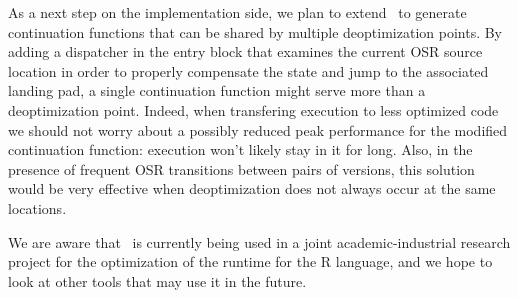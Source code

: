 As a next step on the implementation side, we plan to extend \osrkit\ to generate continuation functions that can be shared by multiple deoptimization points. By adding a dispatcher in the entry block that examines the current OSR source location in order to properly compensate the state and jump to the associated landing pad, a single continuation function might serve more than a deoptimization point. Indeed, when transfering execution to less optimized code we should not worry about a possibly reduced peak performance for the modified continuation function: execution won't likely stay in it for long. Also, in the presence of frequent OSR transitions between pairs of versions, this solution would be very effective when deoptimization does not always occur at the same locations.

We are aware that \osrkit\ is currently being used in a joint academic-industrial research project for the optimization of the runtime for the R language, and we hope to look at other tools that may use it in the future.